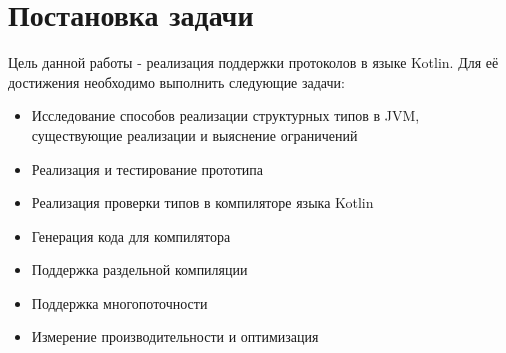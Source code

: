 \section*{Постановка задачи}
Цель данной работы - реализация поддержки протоколов в языке Kotlin. Для её достижения необходимо выполнить следующие задачи:
\begin{itemize}
    \item Исследование способов реализации структурных типов в JVM, существующие реализации и выяснение ограничений
    \item Реализация и тестирование прототипа
    \item Реализация проверки типов в компиляторе языка Kotlin
    \item Генерация кода для компилятора
    \item Поддержка раздельной компиляции
    \item Поддержка многопоточности
    \item Измерение производительности и оптимизация
\end{itemize}